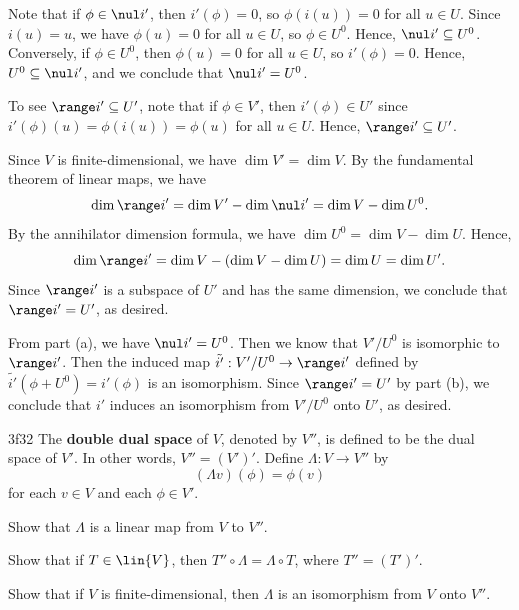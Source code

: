 \begin{solenum}
    \item Note that if $\phi \in \nul i'$, then $i'(\phi) = 0$, so $\phi(i(u)) = 0$ for all $u \in U$.
	Since $i(u) = u$, we have $\phi(u) = 0$ for all $u \in U$, so $\phi \in U^0$.
	Hence, $\nul i' \subseteq U^0$.
	Conversely, if $\phi \in U^0$, then $\phi(u) = 0$ for all $u \in U$, so $i'(\phi) = 0$.
	Hence, $U^0 \subseteq \nul i'$, and we conclude that $\nul i' = U^0$.
    \item To see $\range i' \subseteq U'$, note that if $\phi \in V'$, then $i'(\phi) \in U'$ since $i'(\phi)(u) = \phi(i(u)) = \phi(u)$ for all $u \in U$.
	Hence, $\range i' \subseteq U'$.
    
    Since $V$ is finite-dimensional, we have $\dim V' = \dim V$.
	By the fundamental theorem of linear maps, we have
    \[
    	\dim \range i' = \dim V' - \dim \nul i' = \dim V - \dim U^0.
    \]
    By the annihilator dimension formula, we have $\dim U^0 = \dim V - \dim U$.
	Hence,
    \[
    	\dim \range i' = \dim V - (\dim V - \dim U) = \dim U = \dim U'.
    \]
    Since $\range i'$ is a subspace of $U'$ and has the same dimension, we conclude that $\range i' = U'$, as desired.
    \item From part (a), we have $\nul i' = U^0$.
	Then we know that $V' / U^0$ is isomorphic to $\range i'$.
	Then the induced map $\tilde{i'}: V' / U^0 \to \range i'$ defined by $\tilde{i'}(\phi + U^0) = i'(\phi)$ is an isomorphism.
	Since $\range i' = U'$ by part (b), we conclude that $i'$ induces an isomorphism from $V' / U^0$ onto $U'$, as desired.
\end{solenum}

\begin{exercise}{3f32}
    The \textbf{double dual space} of $V$, denoted by $V''$, is defined to be the dual space of $V'$.
	In other words, $V'' = (V')'$.
	Define $\Lambda: V \to V''$ by
    \[
    	(\Lambda v)(\phi) = \phi(v)
    \]
    for each $v \in V$ and each $\phi \in V'$.
    \begin{subexercises}
        \item Show that $\Lambda$ is a linear map from $V$ to $V''$.
        \item Show that if $T \in \lin{V}$, then $T'' \circ \Lambda = \Lambda \circ T$, where $T'' = (T')'$.
        \item Show that if $V$ is finite-dimensional, then $\Lambda$ is an isomorphism from $V$ onto $V''$.
    \end{subexercises}
\end{exercise}

